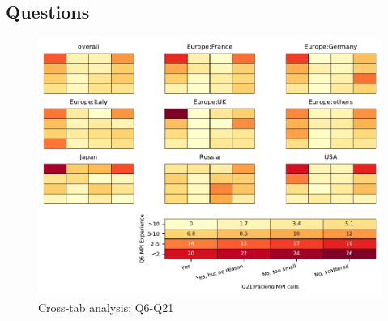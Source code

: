 
\subsection{Questions}


\begin{figure}
\begin{center}
\includegraphics[width=12cm]{../pdfs/Q6-Q21.pdf}
\caption{Cross-tab analysis: Q6-Q21}
\label{fig:Q6-Q21}
\end{center}
\end{figure}
